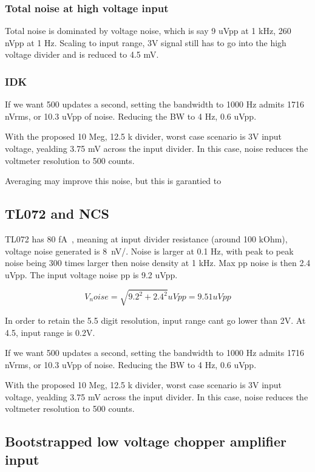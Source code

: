 \documentclass[11pt]{article}
\begin{document}
\subsubsection{Total noise at high voltage input}
Total noise is dominated by voltage noise, which is say 9 uVpp at 1 kHz, 
260 nVpp at 1 Hz. Scaling to input range, 3V signal still has to go into the 
high voltage divider and is reduced to 4.5 mV. 

\subsubsection{IDK}
If we want 500 updates a second, setting the bandwidth to 1000 Hz admits 
1716 nVrms, or 10.3 uVpp of noise.
Reducing the BW to 4 Hz, 0.6 uVpp.

With the proposed 10 Meg, 12.5 k divider, worst case scenario is 3V input voltage,
yealding 3.75 mV across the input divider. In this case, noise reduces the 
voltmeter resolution to 500 counts.


Averaging may improve this noise, but this is garantied to 


\subsection{TL072 and NCS}
TL072 has 80 \si{\femto \ampere \sqrt{\hertz}}, meaning at input divider
resistance (around 100 kOhm), voltage noise generated is \si{8 nV/}. 
Noise is larger at 0.1 Hz, with peak to peak noise being 300 times larger then
noise density at 1 kHz. Max pp noise is then 2.4 uVpp. 
The input voltage noise pp is 9.2 uVpp.

\begin{equation}
  V_noise = \sqrt{ 9.2^2 + 2.4^2} uVpp = 9.51 uVpp
  \label{eq:NCS218xx input noise}
\end{equation}

In order to retain the 5.5 digit resolution, input range cant go lower than 2V.
At 4.5, input range is 0.2V.

If we want 500 updates a second, setting the bandwidth to 1000 Hz admits 
1716 nVrms, or 10.3 uVpp of noise.
Reducing the BW to 4 Hz, 0.6 uVpp.

With the proposed 10 Meg, 12.5 k divider, worst case scenario is 3V input voltage,
yealding 3.75 mV across the input divider. In this case, noise reduces the 
voltmeter resolution to 500 counts.

\pagebreak

\subsection{Bootstrapped low voltage chopper amplifier input}
\end{document}
